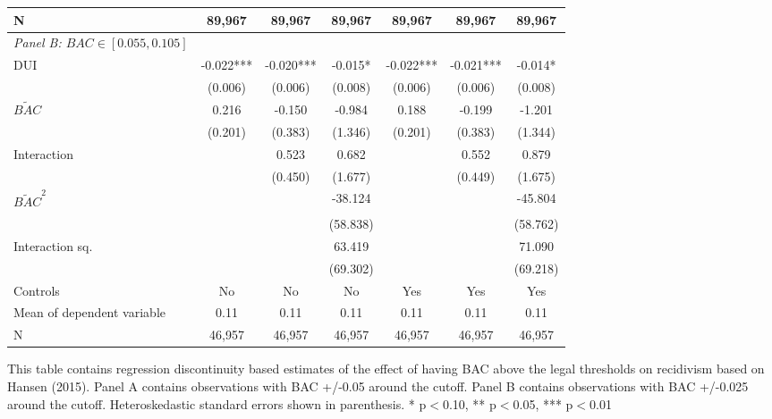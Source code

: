 \documentclass[11pt]{article}\usepackage[]{graphicx}\usepackage[]{color}
\begin{document}
\begin{enumerate}
\begin{table}[htbp]
\begin{center}
\begin{threeparttable}
\begin{tabular}{l*{6}{c}}
N                   &      89,967   &      89,967   &      89,967   &      89,967   &      89,967   &      89,967   \\
\midrule
\textit{Panel B: $BAC \in [0.055, 0.105]$ } & & & & & &		\\
DUI                 &      -0.022***&      -0.020***&      -0.015*  &      -0.022***&      -0.021***&      -0.014*  \\
                    &     (0.006)   &     (0.006)   &     (0.008)   &     (0.006)   &     (0.006)   &     (0.008)   \\
$\tilde{BAC}$             &       0.216   &      -0.150   &      -0.984   &       0.188   &      -0.199   &      -1.201   \\
                    &     (0.201)   &     (0.383)   &     (1.346)   &     (0.201)   &     (0.383)   &     (1.344)   \\
Interaction         &               &       0.523   &       0.682   &               &       0.552   &       0.879   \\
                    &               &     (0.450)   &     (1.677)   &               &     (0.449)   &     (1.675)   \\
$\tilde{BAC}^2$            &               &               &     -38.124   &               &               &     -45.804   \\
                    &               &               &    (58.838)   &               &               &    (58.762)   \\
Interaction sq.      &               &               &      63.419   &               &               &      71.090   \\
                    &               &               &    (69.302)   &               &               &    (69.218)   \\
\midrule
Controls   & No			& No			& No 	& Yes 		& Yes 		& Yes  \\
Mean of dependent variable&        0.11   &        0.11   &        0.11   &        0.11   &        0.11   &        0.11   \\
N                   &      46,957   &      46,957   &      46,957   &      46,957   &      46,957   &      46,957   \\
\bottomrule
\end{tabular}
\begin{tablenotes}
\tiny
\item This table contains regression discontinuity based estimates of the effect of having BAC above the legal thresholds on recidivism based on Hansen (2015). Panel A contains observations with BAC +/-0.05 around the cutoff. Panel B contains observations with BAC +/-0.025 around the cutoff. Heteroskedastic standard errors shown in parenthesis.  * p$<$0.10, ** p$<$0.05, *** p$<$0.01
\end{tablenotes}
\end{threeparttable}
\end{center}
\end{table}


\end{enumerate}
\end{document}

